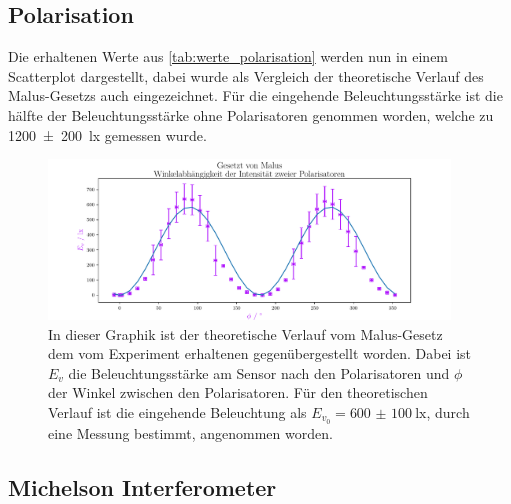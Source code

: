 \documentclass[12pt,english,ngerman]{scrartcl}
\begin{document}
\subsection{Polarisation}

Die erhaltenen Werte aus \autoref{tab:werte_polarisation} werden nun in einem
Scatterplot dargestellt, dabei wurde als Vergleich der theoretische Verlauf des
Malus-Gesetzs auch eingezeichnet. Für die eingehende Beleuchtungsstärke ist die
hälfte der Beleuchtungsstärke ohne Polarisatoren genommen worden, welche zu
\SI{1200(200)}{\lux} gemessen wurde.

\begin{figure}[H]
	\begin{center}
		\includegraphics[width=0.95\textwidth]{figures/pol.pdf}
	\end{center}
	\caption{In dieser Graphik ist der theoretische Verlauf vom Malus-Gesetz
    dem vom Experiment erhaltenen gegenübergestellt worden. Dabei ist $E_v$ 
    die Beleuchtungsstärke am Sensor nach den Polarisatoren und $\phi$ der
    Winkel zwischen den Polarisatoren. Für den theoretischen Verlauf ist die 
    eingehende Beleuchtung als $E_{v_0}=\SI{600(100)}{\lux}$, durch eine Messung bestimmt,
    angenommen worden.
  }\label{fig:auswertung_polarisation}
\end{figure}


\subsection{Michelson Interferometer}

\end{document}
